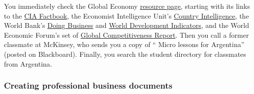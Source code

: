 \documentclass[letterpaper,12pt]{article}
\begin{document}
You immediately check the Global Economy 
\href{http://www.stern.nyu.edu/eco/b012303/Backus/ge_resources_db.htm}
{resource page},
starting with its links to the 
\href{https://www.cia.gov/library/publications/the-world-factbook/index.html}
{CIA Factbook}, 
the Economist Intelligence Unit's 
\href{http://db.eiu.com/index.asp?layout=AllTitles}{Country Intelligence},
the World Bank's 
\href{http://www.doingbusiness.org/}
{Doing Business} 
and 
\href{http://web.worldbank.org/WBSITE/EXTERNAL/DATASTATISTICS/0,,contentMDK:20398986~menuPK:64133163~pagePK:64133150~piPK:64133175~theSitePK:239419,00.html}
{World Development Indicators}, 
and the World Economic Forum's set of 
\href{http://www.weforum.org/en/index.htm}
{Global Competitiveness Report}.
Then you call a former classmate at McKinsey,
who sends you a copy of 
``%
{Micro lessons for Argentina}'' (posted on Blackboard).  
Finally, you search the student directory for 
classmates from Argentina.  



\subsubsection*{Creating professional business documents} 
\end{document}
